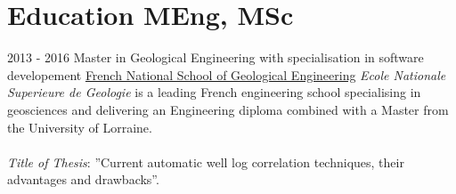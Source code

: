 \documentclass[]{friggeri-cv}
\begin{document}
\section{Education MEng, MSc}
\begin{entrylist}
  \entry
    {2013 - 2016}
    {Master in Geological Engineering with specialisation in software developement}
    {\href{http://ensg.univ-lorraine.fr/english/}{French National School of Geological Engineering}}
    {\emph{Ecole Nationale Superieure de Geologie} is a leading French engineering school specialising in geosciences and delivering an Engineering diploma combined with a Master from the University of Lorraine.\\ 
    \\
    \emph{Title of Thesis}: ”Current automatic well log correlation techniques, their advantages and drawbacks”.
	}
  	

\end{entrylist}
\vspace*{\fill}
\end{document}
